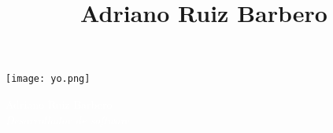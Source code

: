 \documentclass[11pt, oneside, a4paper, titlepage]{article}
\title{Adriano Ruiz Barbero}
\begin{document}

\begin{tcolorbox} \begin{minipage}{4.5cm}
\hspace*{-0.3cm}
\texttt{[image: yo.png]} 
\end{minipage}
\begin{minipage}{15cm} 
	\begin{center} 
		\Huge{\textcolor{white}{Adriano Ruiz Barbero}} \\ 
		\vspace*{0.5cm} 
		\Large{\textcolor{white}{\emph{Desarrollador de software}}} 
	\end{center} 
\end{minipage} 
\end{tcolorbox}
\end{document}
